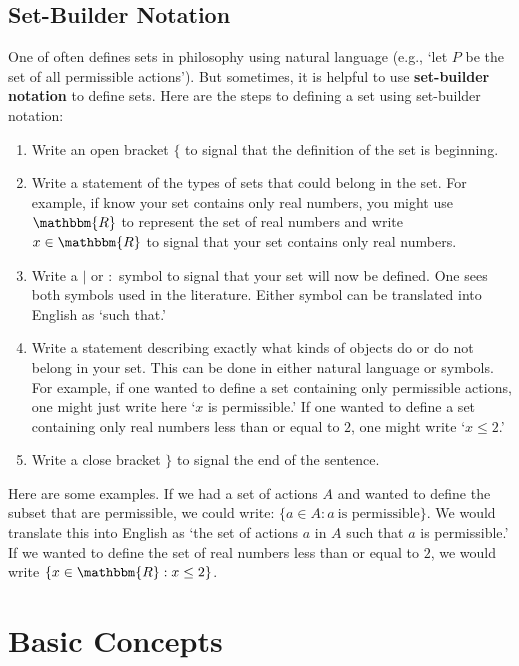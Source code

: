 \documentclass[11pt]{article}
\theoremstyle{definition}
\theoremstyle{remark}
\begin{document}
\subsection{Set-Builder Notation}
One of often defines sets in philosophy using natural language (e.g., `let $P$ be the set of all permissible actions'). But sometimes, it is helpful to use \textbf{set-builder notation} to define sets. Here are the steps to defining a set using set-builder notation:
\begin{enumerate}
    \item Write an open bracket $\{$ to signal that the definition of the set is beginning.

    \item Write a statement of the types of sets that could belong in the set. For example, if know your set contains only real numbers, you might use $\mathbbm{R}$ to represent the set of real numbers and write $x\in\mathbbm{R}$ to signal that your set contains only real numbers.

    \item Write a $|$ or $:$ symbol to signal that your set will now be defined. One sees both symbols used in the literature. Either symbol can be translated into English as `such that.' 

    \item Write a statement describing exactly what kinds of objects do or do not belong in your set. This can be done in either natural language or symbols. For example, if one wanted to define a set containing only permissible actions, one might just write here `$x$ is permissible.' If one wanted to define a set containing only real numbers less than or equal to $2$, one might write `$x\leq 2$.'

    \item Write a close bracket $\}$ to signal the end of the sentence.
\end{enumerate}
Here are some examples. If we had a set of actions $A$ and wanted to define the subset that are permissible, we could write:
$\{a\in A : a \ \text{is permissible}\}.$
We would translate this into English as `the set of actions $a$ in $A$ such that $a$ is permissible.' If we wanted to define the set of real numbers less than or equal to $2$, we would write $\{x\in\mathbbm{R}:x\leq 2\}$.\par 

\section{Basic Concepts}
\end{document}
